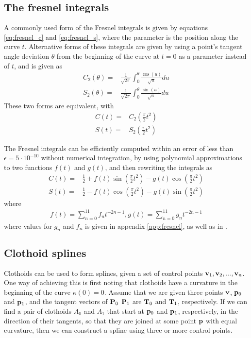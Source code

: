 \subsection{The fresnel integrals}
A commonly used form of the Fresnel integrals is given by equations \ref{eq:fresnel_c} and \ref{eq:fresnel_s}, where the parameter is the position along the curve $t$. Alternative forms of these integrals are given by using a point's tangent angle deviation $\theta$ from the beginning of the curve at $t=0$ as a parameter instead of $t$, and is given as\cite{clothoid}\cite{mathhandbook}
\begin{align}
C_2(\theta) =& \frac{1}{\sqrt{2\pi} }\int_0^\theta \frac{\cos(u)}{\sqrt{u}} du\label{eq:fresnel_c2}\\
S_2(\theta) =& \frac{1}{\sqrt{2\pi} }\int_0^\theta \frac{\sin(u)}{\sqrt{u}} du\label{eq:fresnel_s2}
\end{align}
These two forms are equivalent, with\cite{mathhandbook}
\begin{align}
C(t) =& C_2\left(\frac{\pi}{2}t^2\right)\\
S(t) =& S_2\left(\frac{\pi}{2}t^2\right)
\end{align}

The Fresnel integrals can be efficiently computed within an error of less than $\epsilon = 5\cdot 10^{-10}$ without numerical integration, by using polynomial approximations to two functions $f(t)$ and $g(t)$, and then rewriting the integrals as\cite{fresnel}
\begin{align}
C(t) =& \frac{1}{2} + f(t)\sin\left(\frac{\pi}{2}t^2\right) - g(t)\cos\left(\frac{\pi}{2}t^2\right)\\
S(t) =& \frac{1}{2} - f(t)\cos\left(\frac{\pi}{2}t^2\right) - g(t)\sin\left(\frac{\pi}{2}t^2\right)
\end{align}
where
\begin{align}
f(t) = \sum_{n=0}^{11} f_nt^{-2n-1}, g(t) = \sum_{n=0}^{11} g_nt^{-2n-1}
\end{align}
where values for $g_n$ and $f_n$ is given in appendix \ref{app:fresnel}, as well as in \cite{fresnel}. 

\subsection{Clothoid splines}
Clothoids can be used to form splines, given a set of control points $\mathbf{v}_1, \mathbf{v}_2, ..., \mathbf{v}_n$.\cite{clothoid} One way of achieving this is first noting that clothoids have a curvature in the beginning of the curve $\kappa(0) = 0$. Assume that we are given three points $\mathbf{v}$, $\mathbf{p}_0$ and $\mathbf{p}_1$, and the tangent vectors of ${\mathbf P}_0$ ${\mathbf P}_1$ are ${\mathbf T}_0$ and ${\mathbf T}_1$, respectively. If we can find a pair of clothoids $A_0$ and $A_1$ that start at $\mathbf{p}_0$ and $\mathbf{p}_1$, respectively, in the direction of their tangents, so that they are joined at some point $\mathbf{p}$ with equal curvature, then we can construct a spline using three or more control points.\cite{clothoid} 

